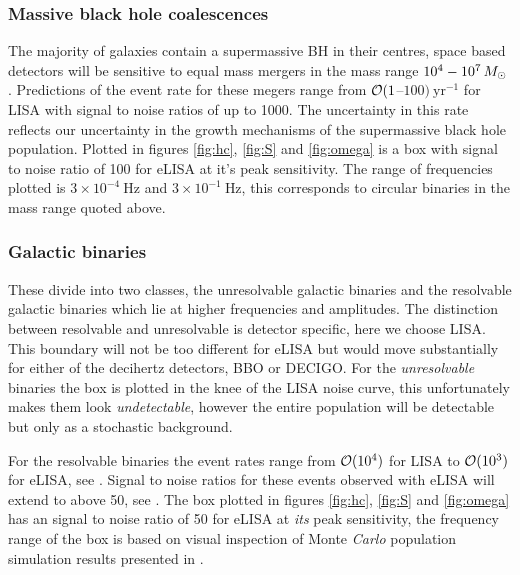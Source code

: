 \subsubsection{Massive black hole coalescences}
The majority of galaxies contain a supermassive BH in their centres, space based detectors will be sensitive to equal mass mergers in the mass range $10^{4}-10^{7}\,M_{ \odot }$ \cite{JohnsLivingReview}. Predictions of the event rate for these megers range from ${\cal{O}}(1$--$100)~\textrm{yr}^{-1}$ for LISA with signal to noise ratios of up to 1000. The uncertainty in this rate reflects our uncertainty in the growth mechanisms of the supermassive black hole population. Plotted in figures \ref{fig:hc}, \ref{fig:S} and \ref{fig:omega} is a box with signal to noise ratio of 100 for eLISA at it's peak sensitivity. The range of frequencies plotted is $3\times 10^{-4}~\textrm{Hz}$ and $3\times 10^{-1}~\textrm{Hz}$, this corresponds to circular binaries in the mass range quoted above.

\subsubsection{Galactic binaries}
These divide into two classes, the unresolvable galactic binaries and the resolvable galactic binaries which lie at higher frequencies and amplitudes. The distinction between resolvable and unresolvable is detector specific, here we choose LISA. This boundary will not be too different for eLISA but would move substantially for either of the decihertz detectors, BBO or DECIGO. For the \emph{unresolvable} binaries the box is plotted in the knee of the LISA noise curve, this unfortunately makes them look \emph{undetectable}, however the entire population will be detectable but only as a stochastic background.

For the resolvable binaries the event rates range from ${\cal{O}}(10^{4})$ for LISA to ${\cal{O}}(10^{3})$ for eLISA, see \cite{JohnsLivingReview}. Signal to noise ratios for these events observed with eLISA will extend to above 50, see \cite{DoingScienceWitheLISA}. The box plotted in figures \ref{fig:hc}, \ref{fig:S} and \ref{fig:omega} has an signal to noise ratio of 50 for eLISA at \emph{its} peak sensitivity, the frequency range of the box is based on visual inspection of Monte \emph{Carlo} population simulation results presented in \cite{DoingScienceWitheLISA}.

